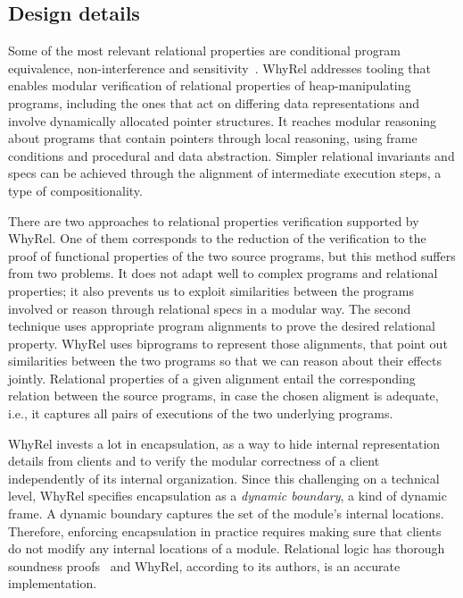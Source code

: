 \subsection{Design details}
\label{subsec:whyrel_deisgn}

Some of the most relevant relational properties are conditional program equivalence, non-interference and sensitivity~\cite{barthe2019verifying}.
WhyRel addresses tooling that enables modular verification of relational properties of heap-manipulating programs, including the ones that act on differing data representations and involve dynamically allocated pointer structures.
It reaches modular reasoning about programs that contain pointers through local reasoning, using frame conditions and procedural and data abstraction.
Simpler relational invariants and specs can be achieved through the alignment of intermediate execution steps, a type of compositionality.

There are two approaches to relational properties verification supported by WhyRel.
One of them corresponds to the reduction of the verification to the proof of functional properties of the two source programs, but this method suffers from two problems.
It does not adapt well to complex programs and relational properties; it also prevents us to exploit similarities between the programs involved or reason through relational specs in a modular way.
The second technique uses appropriate program alignments to prove the desired relational property.
WhyRel uses biprograms to represent those alignments, that point out similarities between the two programs so that we can reason about their effects jointly.
Relational properties of a given alignment entail the corresponding relation between the source programs, in case the chosen aligment is adequate, i.e., it captures all pairs of executions of the two underlying programs.

WhyRel invests a lot in encapsulation, as a way to hide internal representation details from clients and to verify the modular correctness of a client independently of its internal organization.
Since this challenging on a technical level, WhyRel specifies encapsulation as a \emph{dynamic boundary}, a kind of dynamic frame.
A dynamic boundary captures the set of the module's internal locations.
Therefore, enforcing encapsulation in practice requires making sure that clients do not modify any internal locations of a module.
Relational logic has thorough soundness proofs~\cite{10.1145/3551497} and WhyRel, according to its authors, is an accurate implementation.


